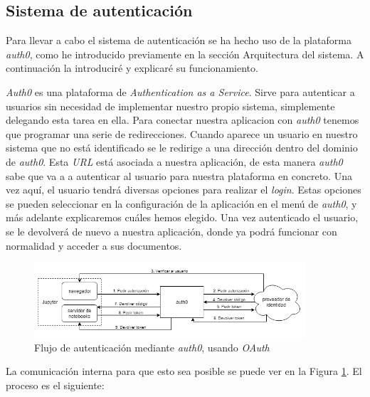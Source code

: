 \documentclass[11pt,spanish,listoffigures,listoftables]{tfgetsinf}
\begin{document}
\subsection{Sistema de autenticación}
\label{subsec:diseno-auth}

Para llevar a cabo el sistema de autenticación se ha hecho uso de la plataforma \textit{auth0}, como he introducido previamente en la sección Arquitectura del sistema. A continuación la introduciré y explicaré su funcionamiento.

\textit{Auth0} es una plataforma de \textit{Authentication as a Service}. Sirve para autenticar a usuarios sin necesidad de implementar nuestro propio sistema, simplemente delegando esta tarea en ella. Para conectar nuestra aplicacion con \textit{auth0} tenemos que programar una serie de redirecciones. Cuando aparece un usuario en nuestro sistema que no está identificado se le redirige a una dirección dentro del dominio de \textit{auth0}. Esta \textit{URL} está asociada a nuestra aplicación, de esta manera \textit{auth0} sabe que va a a autenticar al usuario para nuestra plataforma en concreto. Una vez aquí, el usuario tendrá diversas opciones para realizar el \textit{login}. Estas opciones se pueden seleccionar en la configuración de la aplicación en el menú de \textit{auth0}, y más adelante explicaremos cuáles hemos elegido. Una vez autenticado el usuario, se le devolverá de nuevo a nuestra aplicación, donde ya podrá funcionar con normalidad y acceder a sus documentos.

\begin{figure}[h]
	\centering
  	\includegraphics[width=0.9\textwidth]{auth0-flow.png}
  	\caption{Flujo de autenticación mediante \textit{auth0}, usando \textit{OAuth}}
  	\label{fig:auth0-scheme}
\end{figure}

La comunicación interna para que esto sea posible se puede ver en la Figura \ref{fig:auth0-scheme}. El proceso es el siguiente: 
\end{document}
